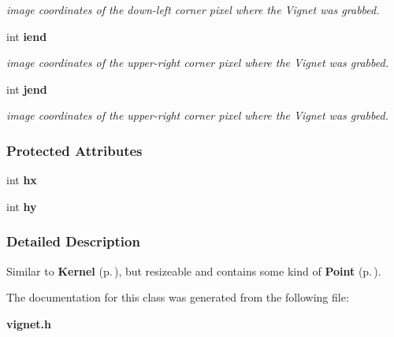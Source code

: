 \begin{CompactItemize}
\begin{CompactList}\small\item\em image coordinates of the down-left corner pixel where the Vignet was grabbed.\item\end{CompactList}\item 
{}
int {\bf iend}\label{class_vignet_m6}

\begin{CompactList}\small\item\em image coordinates of the upper-right corner pixel where the Vignet was grabbed.\item\end{CompactList}\item 
{}
int {\bf jend}\label{class_vignet_m7}

\begin{CompactList}\small\item\em image coordinates of the upper-right corner pixel where the Vignet was grabbed.\item\end{CompactList}\end{CompactItemize}
\subsubsection*{Protected Attributes}
\begin{CompactItemize}
\item 
{}
int {\bf hx}\label{class_vignet_n0}

\item 
{}
int {\bf hy}\label{class_vignet_n1}

\end{CompactItemize}


\subsubsection{Detailed Description}
Similar to {\bf Kernel} {\rm (p.\,\pageref{class_kernel})}, but resizeable and contains some kind of {\bf Point} {\rm (p.\,\pageref{class_point})}.



The documentation for this class was generated from the following file:\begin{CompactItemize}
\item 
{\bf vignet.h}\end{CompactItemize}
